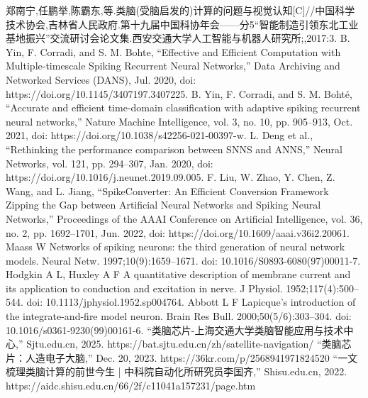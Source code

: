 \documentclass[12pt, a4paper, oneside]{ctexart}
\numberwithin{equation}{section}  %
\begin{document}
\begin{thebibliography}{99}  
    郑南宁,任鹏举,陈霸东,等.类脑(受脑启发的)计算的问题与视觉认知[C]//中国科学技术协会,吉林省人民政府.第十九届中国科协年会——分5“智能制造引领东北工业基地振兴”交流研讨会论文集.西安交通大学人工智能与机器人研究所;,2017:3. 
    B. Yin, F. Corradi, and S. M. Bohte, “Effective and Efficient Computation with Multiple-timescale Spiking Recurrent Neural Networks,” Data Archiving and Networked Services (DANS), Jul. 2020, doi: https://doi.org/10.1145/3407197.3407225.
    B. Yin, F. Corradi, and S. M. Bohté, “Accurate and efficient time-domain classification with adaptive spiking recurrent neural networks,” Nature Machine Intelligence, vol. 3, no. 10, pp. 905–913, Oct. 2021, doi: https://doi.org/10.1038/s42256-021-00397-w.
    L. Deng et al., “Rethinking the performance comparison between SNNS and ANNS,” Neural Networks, vol. 121, pp. 294–307, Jan. 2020, doi: https://doi.org/10.1016/j.neunet.2019.09.005.
    F. Liu, W. Zhao, Y. Chen, Z. Wang, and L. Jiang, “SpikeConverter: An Efficient Conversion Framework Zipping the Gap between Artificial Neural Networks and Spiking Neural Networks,” Proceedings of the AAAI Conference on Artificial Intelligence, vol. 36, no. 2, pp. 1692–1701, Jun. 2022, doi: https://doi.org/10.1609/aaai.v36i2.20061.
    Maass W Networks of spiking neurons: the third generation of neural network models. Neural Netw. 1997;10(9):1659–1671. doi: 10.1016/S0893-6080(97)00011-7.
    Hodgkin A L, Huxley A F A quantitative description of membrane current and its application to conduction and excitation in nerve. J Physiol. 1952;117(4):500–544. doi: 10.1113/jphysiol.1952.sp004764.
    Abbott L F Lapicque's introduction of the integrate-and-fire model neuron. Brain Res Bull. 2000;50(5/6):303–304. doi: 10.1016/s0361-9230(99)00161-6.
    “类脑芯片-上海交通大学类脑智能应用与技术中心,” Sjtu.edu.cn, 2025. https://bat.sjtu.edu.cn/zh/satellite-navigation/
    “类脑芯片：人造电子大脑,” Dec. 20, 2023. https://36kr.com/p/2568941971824520
    “一文梳理类脑计算的前世今生 | 中科院自动化所研究员李国齐,” Shisu.edu.cn, 2022. https://aidc.shisu.edu.cn/66/2f/c11041a157231/page.htm
\end{thebibliography}
\end{document}
